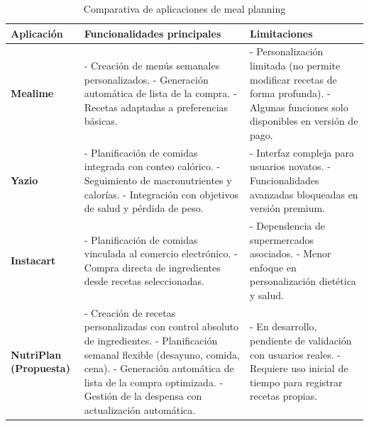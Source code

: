 \documentclass[twoside, openright, 11pt]{report}
\begin{document}
  \begin{table}[H]
  	\centering
  	
  	\begin{tabular}{|p{3cm}|p{5cm}|p{5cm}|}
  		\hline
  		\textbf{Aplicación} & \textbf{Funcionalidades principales} & \textbf{Limitaciones} \\ \hline
  		\textbf{Mealime} & 
  		- Creación de menús semanales personalizados. \newline
  		- Generación automática de lista de la compra. \newline
  		- Recetas adaptadas a preferencias básicas. & 
  		- Personalización limitada (no permite modificar recetas de forma profunda). \newline
  		- Algunas funciones solo disponibles en versión de pago. \\ \hline
  		
  		\textbf{Yazio} & 
  		- Planificación de comidas integrada con conteo calórico. \newline
  		- Seguimiento de macronutrientes y calorías. \newline
  		- Integración con objetivos de salud y pérdida de peso. & 
  		- Interfaz compleja para usuarios novatos. \newline
  		- Funcionalidades avanzadas bloqueadas en versión premium. \\ \hline
  		
  		\textbf{Instacart} & 
  		- Planificación de comidas vinculada al comercio electrónico. \newline
  		- Compra directa de ingredientes desde recetas seleccionadas. & 
  		- Dependencia de supermercados asociados. \newline
  		- Menor enfoque en personalización dietética y salud. \\ \hline
  		
  		\textbf{NutriPlan (Propuesta)} & 
  		- Creación de recetas personalizadas con control absoluto de ingredientes. \newline
  		- Planificación semanal flexible (desayuno, comida, cena). \newline
  		- Generación automática de lista de la compra optimizada. \newline
  		- Gestión de la despensa con actualización automática. & 
  		- En desarrollo, pendiente de validación con usuarios reales. \newline
  		- Requiere uso inicial de tiempo para registrar recetas propias. \\ \hline
  		
  	\end{tabular}			
  	\caption{Comparativa de aplicaciones de meal planning}
  	\label{tab:comparativa_apps}
  \end{table}
  
\end{document}
